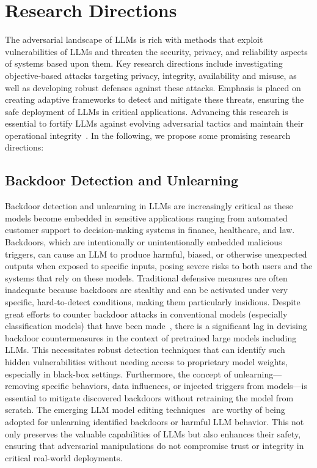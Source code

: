 \section{Research Directions} \label{sec:outlook}

The adversarial landscape of LLMs is rich with methods that exploit vulnerabilities of LLMs and threaten the security, privacy, and reliability aspects of systems based upon them. Key research directions include investigating objective-based attacks targeting privacy, integrity, availability and misuse, as well as developing robust defenses against these attacks. Emphasis is placed on creating adaptive frameworks to detect and mitigate these threats, ensuring the safe deployment of LLMs in critical applications. Advancing this research is essential to fortify LLMs against evolving adversarial tactics and maintain their operational integrity~\cite{liu2024solitary}. In the following, we propose some promising research directions:

\subsection{Backdoor Detection and Unlearning}

Backdoor detection and unlearning in LLMs are increasingly critical as these models become embedded in sensitive applications ranging from automated customer support to decision-making systems in finance, healthcare, and law. Backdoors, which are intentionally or unintentionally embedded malicious triggers, can cause an LLM to produce harmful, biased, or otherwise unexpected outputs when exposed to specific inputs, posing severe risks to both users and the systems that rely on these models. Traditional defensive measures are often inadequate because backdoors are stealthy and can be activated under very specific, hard-to-detect conditions, making them particularly insidious. Despite great efforts to counter backdoor attacks in conventional models (especially classification models) that have been made~\cite{gao2021design,mo2024robust,wang2024mm}, there is a significant lag in devising backdoor countermeasures in the context of pretrained large models including LLMs. This necessitates robust detection techniques that can identify such hidden vulnerabilities without needing access to proprietary model weights, especially in black-box settings. Furthermore, the concept of unlearning—removing specific behaviors, data influences, or injected triggers from models—is essential to mitigate discovered backdoors without retraining the model from scratch. The emerging LLM model editing techniques~\cite{meng2022locating,zhang2024comprehensive} are worthy of being adopted for unlearning identified backdoors or harmful LLM behavior. This not only preserves the valuable capabilities of LLMs but also enhances their safety, ensuring that adversarial manipulations do not compromise trust or integrity in critical real-world deployments.

